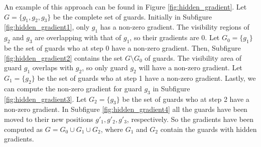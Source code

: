An example of this approach can be found in Figure \ref{fig:hidden_gradient}. Let $G = \{g_1, g_2, g_3\}$ be the complete set of guards. Initially in Subfigure \ref{fig:hidden_gradient1}, only $g_1$ has a non-zero gradient. The visibility regions of $g_2$ and $g_3$ are overlapping with that of $g_1$, so their gradients are 0. Let $G_0 = \{g_1\}$ be the set of guards who at step 0 have a non-zero gradient. 
Then, Subfigure \ref{fig:hidden_gradient2} contains the set $G \setminus G_0$ of guards. The visibility area of guard $g_1$ overlaps with $g_2$, so only guard $g_2$ will have a non-zero gradient. Let $G_1 = \{g_2\}$ be the set of guards who at step 1 have a non-zero gradient.
Lastly, we can compute the non-zero gradient for guard $g_3$ in Subfigure \ref{fig:hidden_gradient3}. Let $G_2 = \{g_3\}$ be the set of guards who at step 2 have a non-zero gradient.
In Subfigure \ref{fig:hidden_gradient4} all the guards have been moved to their new positions $g'_1, g'_2, g'_3$, respectively. So the gradients have been computed as $G = G_0 \cup G_1 \cup G_2$, where $G_1$ and $G_2$ contain the guards with hidden gradients.

